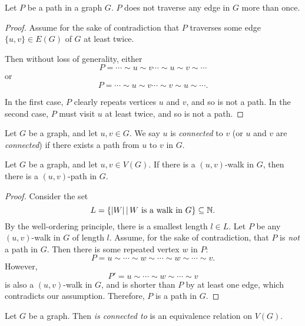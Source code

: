\begin{prop}
    Let $P$ be a path in a graph $G$. $P$ does not traverse any edge in $G$ more than once.
\end{prop}

\begin{proof}
    Assume for the sake of contradiction that $P$ traverses some edge $\{u, v\} \in E(G)$ of $G$ at least twice.

    Then without loss of generality, either \[P = \cdots \sim u \sim v \cdots \sim u \sim v \sim \cdots\] or \[P = \cdots \sim u \sim v \cdots \sim v \sim u \sim \cdots.\]

    In the first case, $P$ clearly repeats vertices $u$ and $v$, and so is not a path. In the second case, $P$ must visit $u$ at least twice, and so is not a path.
\end{proof}

\begin{defn}
    Let $G$ be a graph, and let $u, v \in G$. We say $u$ is \emph{connected} to $v$ (or $u$ and $v$ are \emph{connected}) if there exists a path from $u$ to $v$ in $G$.
\end{defn}

\begin{lemma}\label{walk-implies-path}
    Let $G$ be a graph, and let $u, v \in V(G)$. If there is a $(u, v)$-walk in $G$, then there is a $(u, v)$-path in $G$.
\end{lemma}

\begin{proof}
    Consider the set \[L = \left\{|W| \,\middle|\, W \textrm{ is a walk in } G\right\} \subseteq \mathbb{N}.\] By the well-ordering principle, there is a smallest length $l \in L$. Let $P$ be any $(u,v)$-walk in $G$ of length $l$. Assume, for the sake of contradiction, that $P$ is \emph{not} a path in $G$. Then there is some repeated vertex $w$ in $P$: \[P = u \sim \cdots \sim w \sim \cdots \sim w \sim \cdots \sim v.\] However, \[P' = u \sim \cdots \sim w \sim \cdots \sim v\] is also a $(u, v)$-walk in $G$, and is shorter than $P$ by at least one edge, which contradicts our assumption. Therefore, $P$ is a path in $G$.
\end{proof}

\begin{prop}
    Let $G$ be a graph. Then \emph{is connected to} is an equivalence relation on $V(G)$.
\end{prop}

